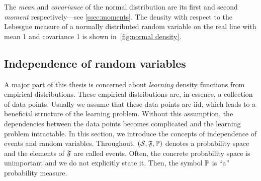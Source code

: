 The \emph{mean} and \emph{covariance} of the normal distribution are its first and second \emph{moment} respectively---see \cref{ssec:moments}.
The density with respect to the Lebesgue measure of a normally distributed random variable on the real line with mean \num{1} and covariance \num{1} is shown in~\cref{fig:normal density}.
\begin{sidefigure}
	\caption[Density of a normal distribution in one dimension]{%
		The density with respect to the Lebesgue measure of a one-dimensional normally distributed random variable with mean \num{1} and covariance \num{1}.%
	}%
	\label{fig:normal density}
\end{sidefigure}
\subsection{Independence of random variables}
A major part of this thesis is concerned about \emph{learning} density functions from empirical distributions.
These empirical distributions are, in essence, a collection of data points.
Usually we assume that these data points are \gls{iid}, which leads to a beneficial structure of the learning problem.
Without this assumption, the dependencies between the data points becomes complicated and the learning problem intractable.
In this section, we introduce the concepts of independence of events and random variables.
Throughout, \( (\mathcal{S}, \mathfrak{F}, \mathbb{P}) \) denotes a probability space and the elements of \( \mathfrak{F} \) are called events.
Often, the concrete probability space is unimportant and we do not explicitly state it.
Then, the symbol \( \mathbb{P} \) is \enquote{a} probability measure.

